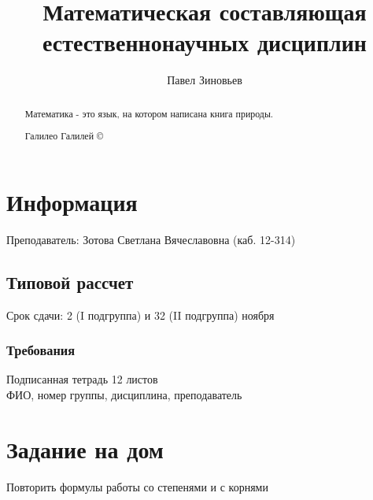 \documentclass[a4paper, 11pt, oneside]{article}
\title{Математическая составляющая естественнонаучных дисциплин}
\author{Павел Зиновьев}
\begin{document}
\maketitle
\begin{abstract}
	Математика - это язык, на котором написана книга природы.
	\begin{flushright}
		 Галилео Галилей \copyright
	\end{flushright}
\end{abstract}
\newpage
\tableofcontents
\contentsname
\newpage


\section{Информация}
Преподаватель: Зотова Светлана Вячеславовна (каб. 12-314)
\subsection{Типовой рассчет}
Срок сдачи: 2 (I подгруппа) и 32 (II подгруппа)  ноября
\subsubsection{Требования}
Подписанная тетрадь 12 листов\\
ФИО, номер группы, дисциплина, преподаватель


\section{Задание на дом}


Повторить формулы работы со степенями и с корнями
\end{document}
